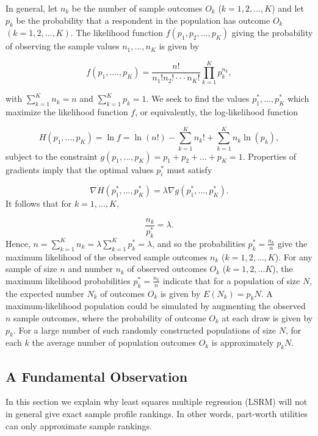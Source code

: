 \documentclass[a4paper, 12pt]{article}
\begin{document}
In general, let $n_k$ be the number of sample outcomes $O_k$ ($k=1,2,...,K$) and let $p_k$ be the probability that a respondent in the population  has outcome $O_k$ $(k= 1, 2, ..., K)$.  The likelihood function $f(p_1, p_2, ..., p_K)$ giving the probability of observing the sample values $n_1, ..., n_{K}$ is given by

\begin{equation}
f(p_1, ...., p_K)= \frac{n!}{n_1!n_2!\cdot\cdot\cdot n_K!} \prod_{k=1}^K p_k^{n_k},
\end{equation}
\label{eq:4}

{\flushleft with} $\sum_{k=1}^{K}n_k=n$ and $\sum_{k=1}^{K}p_k=1$.
We seek to find the values $p_1^*, ..., p_{K}^*$ which maximize the likelihood function $f$, or equivalently, the log-likelihood function

\begin{equation}
H(p_1, ..., p_K)=\ln f = \ln(n!) - \sum_{k=1}^{K} n_k! +\sum_{k=1}^{K} n_k\ln(p_k),
\end{equation}
\label{eq:5}
{\flushleft subject} to the constraint $g(p_1, ..., p_{K})=p_1+p_2+...+p_K=1$.  Properties of gradients imply that the optimal values $p_i^*$ must satisfy

\begin{equation}
\nabla H(p_1^*, ..., p_K^*) = \lambda \nabla g(p_1^*, ..., p_{K}^*).
\end{equation}
\label{eq:6}
{\flushleft It} follows that for $k=1, ..., K$,

\begin{equation}
\frac{n_k}{p_k^*}=\lambda.
\end{equation}
\label{eq:7}
{\flushleft Hence,} $n=\sum_{k=1}^{K} n_k =  \lambda \sum_{k=1}^{K} p_k^* = \lambda$, and so the probabilities $p_k^* = \frac{n_k}{n}$ give the maximum likelihood of the observed sample outcomes $n_k$ ($k=1, 2, ..., K$).  For any sample of size $n$ and number $n_k$ of observed outcomes $O_k$ ($k=1, 2, ...K$), the maximum likelihood probabilities $p_k^*=\frac{n_k}{n}$
indicate that for a population of size $N$, the expected number $N_k$ of outcomes $O_k$ is given by $E(N_k)=p_k N.$  A maximum-likelihood population could be simulated by augmenting the observed $n$ sample outcomes, where the probability of outcome $O_k$ at each draw is given by $p_k$.   For a large number of such randomly constructed populations of size $N$, for each $k$ the average number of population outcomes $O_k$ is approximately $p_k N$.



\subsection{A Fundamental Observation}
In this section we explain why  least squares multiple  regression (LSRM) will not in general give exact sample profile rankings. In other words, part-worth utilities can only approximate sample rankings.
\end{document}
